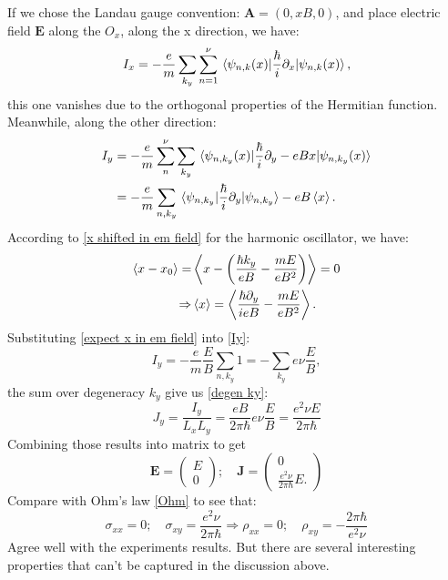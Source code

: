 \documentclass[unnumsec,webpdf,modern,large]{mam-authoring-template}%
\theoremstyle{thmstyleone}%
\theoremstyle{thmstyletwo}%
\theoremstyle{thmstylethree}%
\begin{document}
If we chose the Landau gauge convention: \(\textbf{A}= (0,xB,0)\), and place electric field \(\textbf{E}\) along the \(O_x\), along the x direction, we have:
\begin{equation}
	I_x = -\frac{e}{m} \sum_{k_y} \sum_{n =1}^\nu \ev*{\frac{\hbar}{i} \partial_x}{\psi_{n,k}(x)},
\end{equation}
this one vanishes due to the orthogonal properties of the Hermitian function. Meanwhile, along the other direction:
\begin{align}
	I_y &= -\frac{e}{m}\sum_{n}^\nu\sum_{k_y} \ev*{\frac{\hbar}{i}\partial_{y} - eBx}{\psi_{n,k_y}(x)}\nonumber\\
	\label{Iy}
	&= -\frac{e}{m} \sum_{n,k_y} \ev*{\frac{\hbar}{i}\partial_y}{\psi_{n,k_y}} -eB \ev{x}.
\end{align}
\quad According to \eqref{x shifted in em field} for the harmonic oscillator, we have:
\begin{align}
	\ev{x - x_0} =& \ev{x - \bigg(\frac{\hbar k_y}{eB} - \frac{mE}{eB^2}\bigg)} = 0\nonumber\\
\label{expect x in em field}
	 \Rightarrow& \ev{x} = \ev{\frac{\hbar \partial_y}{i eB} - \frac{mE}{eB^2}}.
\end{align}
\quad Substituting \eqref{expect x in em field} into \eqref{Iy}:
\begin{equation}
	I_y = -\frac{e}{m} \frac{E}{B}\sum_{n,k_y} 1 = -\sum_{k_y}e\nu\frac{E}{B},
\end{equation}
the sum over degeneracy \(k_y\) give us \eqref{degen ky}:
\begin{equation}
	J_y = \frac{I_y}{L_x L_y} =  \frac{eB}{2\pi \hbar} e\nu \frac{E}{B} = \frac{e^2 \nu E}{2\pi \hbar}
\end{equation}
\quad Combining those results into matrix to get
\begin{equation}
	\textbf{E} = \begin{pmatrix}
		E\\0
	\end{pmatrix} ; \quad \textbf{J} = \begin{pmatrix}
	0 \\ \frac{e^2 \nu}{2\pi \hbar}E.
	\end{pmatrix}
\end{equation}
\quad Compare with Ohm's law \eqref{Ohm} to see that:
$$\sigma_{xx} = 0;\quad \sigma_{xy}= \frac{e^2 \nu}{2\pi \hbar} \Rightarrow \rho_{xx}= 0; \quad \rho_{xy} = -\frac{2\pi \hbar}{e^2\nu}$$
\quad Agree well with the experiments results. But there are several interesting properties that can't be captured in the discussion above.
\end{document}
